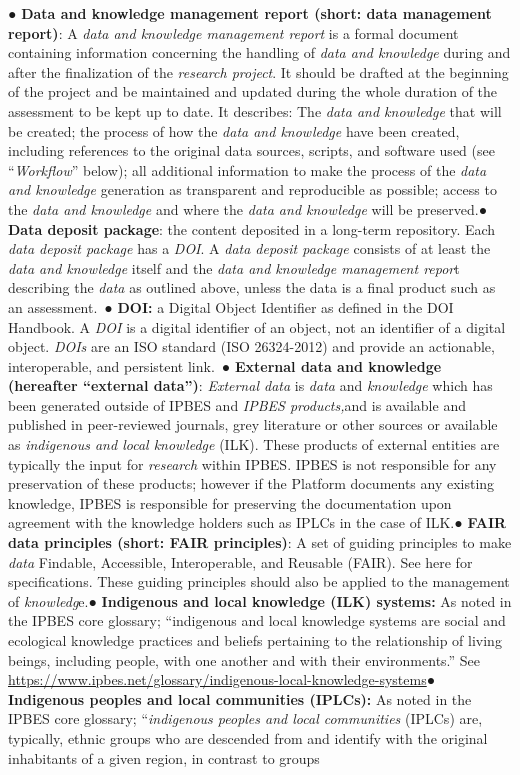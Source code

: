 \documentclass{article}
\begin{document}
● \textbf{Data and knowledge management report (short: data management report)}: A \textit{data and knowledge management report} is a formal document containing information concerning the handling of \textit{data and knowledge} during and after the finalization of the \textit{research project}. It should be drafted at the beginning of the project and be maintained and updated during the whole duration of the assessment to be kept up to date. It describes: The \textit{data and knowledge} that will be created; the process of how the \textit{data and knowledge} have been created, including references to the original data sources, scripts, and software used (see “\textit{Workflow}” below); all additional information to make the process of the \textit{data and knowledge} generation as transparent and reproducible as possible; access to the \textit{data and knowledge} and where the \textit{data and knowledge} will be preserved.● \textbf{Data deposit package}: the content deposited in a long-term repository. Each \textit{data deposit package} has a\textit{ DOI}. A \textit{data deposit package} consists of at least the \textit{data and knowledge} itself and the \textit{data and knowledge management repor}t describing the \textit{data} as outlined above, unless the data is a final product such as an assessment. ● \textbf{DOI:} a Digital Object Identifier as defined in the DOI Handbook. A \textit{DOI} is a digital identifier of an object, not an identifier of a digital object.\textit{ DOIs} are an ISO standard (ISO 26324-2012) and provide an actionable, interoperable, and persistent link. ● \textbf{External data and knowledge (hereafter “external data”)}: \textit{External data} is \textit{data }and \textit{knowledge }which has been generated outside of IPBES and \textit{IPBES products,}and is available and published in peer-reviewed journals, grey literature or other sources or available as \textit{indigenous and local knowledge} (ILK). These products of external entities are typically the input for \textit{research} within IPBES. IPBES is not responsible for any preservation of these products; however if the Platform documents any existing knowledge, IPBES is responsible for preserving the documentation upon agreement with the knowledge holders such as IPLCs in the case of ILK.● \textbf{FAIR data principles (short: FAIR principles)}: A set of guiding principles to make \textit{data} Findable, Accessible, Interoperable, and Reusable (FAIR). See here for specifications. These guiding principles should also be applied to the management of \textit{knowledg}e.● \textbf{Indigenous and local knowledge (ILK) systems: }As noted in the IPBES core glossary; “indigenous and local knowledge systems are social and ecological knowledge practices and beliefs pertaining to the relationship of living beings, including people, with one another and with their environments.” See \href{https://www.ipbes.net/glossary/indigenous-local-knowledge-systems}{https://www.ipbes.net/glossary/indigenous-local-knowledge-systems}● \textbf{Indigenous peoples and local communities (IPLCs): }As noted in the IPBES core glossary; “\textit{indigenous peoples and local communities} (IPLCs) are, typically, ethnic groups who are descended from and identify with the original inhabitants of a given region, in contrast to groups 
\end{document}
